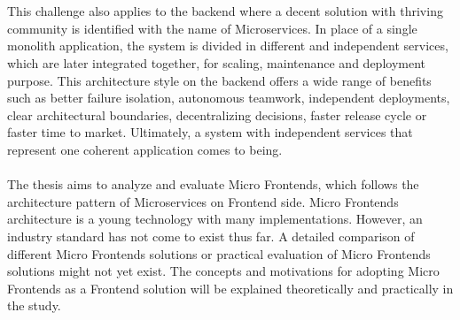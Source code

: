 \documentclass[a4paper]{book}
\begin{document}
\\
\\
This challenge also applies to the backend where a decent solution with thriving community is identified with the name of Microservices. In place of a single monolith application, the system is divided in different and independent services, which are later integrated together, for scaling, maintenance and deployment purpose. This architecture style on the backend offers a wide range of benefits such as better failure isolation, autonomous teamwork, independent deployments, clear architectural boundaries, decentralizing decisions, faster release cycle or faster time to market. Ultimately, a system with independent services that represent one coherent application comes to being.
\\
\\
The thesis aims to analyze and evaluate Micro Frontends, which follows the architecture pattern of Microservices on Frontend side. Micro Frontends architecture is a young technology with many implementations. However, an industry standard has not come to exist thus far. A detailed comparison of different Micro Frontends solutions or practical evaluation of Micro Frontends solutions might not yet exist. The concepts and motivations for adopting Micro Frontends as a Frontend solution will be explained theoretically and practically in the study. 
\end{document}
